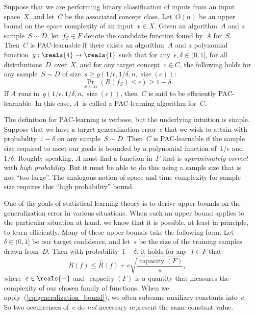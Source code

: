 \documentclass[11pt,a4paper]{article}
\numberwithin{equation}{section}
\newcommand{\size}{\operatorname{size}}
\newcommand{\capacity}{\operatorname{capacity}}
\begin{document}
\begin{definition}
Suppose that we are performing binary classification of inputs from an input
space~$X$, and let~$C$ be the associated concept class. Let~$O(n)$ be an upper
bound on the space complexity of an input~$x \in X$. Given an algorithm~$A$ and
a sample~$S \sim D$, let~$f_S \in F$ denote the candidate function found by~$A$
for~$S$. Then~$C$ is PAC-learnable if there exists an algorithm~$A$ and a
polynomial function~$g : \reals{4} \to \reals{1}$ such that for any~$\epsilon,
\delta \in (0, 1]$, for all distributions~$D$~over~$X$, and for any target
concept~$c \in C$, the following holds for any sample~$S \sim D$ of size~$s \geq
g(1/\epsilon, 1/\delta, n, \size(c))$:
\[
	\Pr_{S \sim D} (R(f_S) \leq \epsilon) \geq 1 - \delta.
\]
If $A$ runs in~$g(1/\epsilon, 1/\delta, n, \size(c))$, then~$C$ is said to be
efficiently PAC-learnable. In this case, $A$~is called a PAC-learning algorithm
for~$C$.
\end{definition}

The definition for PAC-learning is verbose, but the underlying intuition is
simple. Suppose that we have a target generalization error~$\epsilon$ that we
wish to attain with probability~$1 - \delta$ on any sample~$S \sim D$. Then~$C$
is PAC-learnable if the sample size required to meet our goals is bounded by a
polynomial function of~$1/\epsilon$ and~$1/\delta$. Roughly speaking, $A$ must
find a function in~$F$ that is \emph{approximately correct} with \emph{high
probability}. But it must be able to do this using a sample size that is not
``too large''. The analogous notion of space and time complexity for sample size
requires this ``high probability'' bound.

One of the goals of statistical learning theory is to derive upper bounds on the
generalization error in various situations. When such an upper bound applies to
the particular situation at hand, we know that it is possible, at least in
principle, to learn efficiently. Many of these upper bounds take the following
form. Let~$\delta \in (0, 1]$ be our target confidence, and let~$s$ be the size
of the training samples drawn from~$D$. Then with probability~$1 - \delta$, it
holds for any~$f \in F$ that
\begin{equation}
	R(f) \leq \hat{R}(f) + c \sqrt{\frac{\capacity(F)}{s}},
	\label{eq:generalization_bound}
\end{equation}
where~$c \in \reals{+}$ and~$\capacity(F)$ is a quantity that measures the
complexity of our chosen family of functions. When we
apply~(\ref{eq:generalization_bound}), we often subsume auxiliary constants
into~$c$. So two occurrences of~$c$ do \emph{not} necessary represent the same
constant value.
\end{document}
